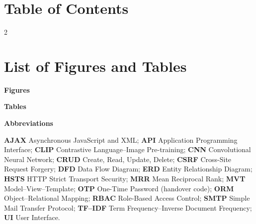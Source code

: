 \documentclass[12pt,a4paper,oneside]{report}
\begin{document}
\clearpage
\chapter*{Table of Contents}
\begingroup
\fontsize{9.6}{11}\selectfont
\setlength{\columnsep}{7mm}
\begin{multicols}{2}
\makeatletter{}\makeatother
\end{multicols}
\endgroup

\clearpage
\chapter*{List of Figures and Tables}
\begingroup
\fontsize{7.9}{8.9}\selectfont
\makeatletter
\setlength{\columnsep}{6mm}
\noindent\begin{minipage}[t]{0.505\textwidth}
\textbf{\color{teal}Figures}\par\vspace{1pt}
\end{minipage}\hfill
\begin{minipage}[t]{0.465\textwidth}
\textbf{\color{teal}Tables}\par\vspace{1pt}
\end{minipage}
\makeatother
\endgroup
\vspace{3pt}
{\color{teal}\bfseries Abbreviations}\par
{\footnotesize\raggedright
\textbf{AJAX} Asynchronous JavaScript and XML; \textbf{API} Application Programming Interface; \textbf{CLIP} Contrastive Language--Image Pre-training; \textbf{CNN} Convolutional Neural Network; \textbf{CRUD} Create, Read, Update, Delete; \textbf{CSRF} Cross-Site Request Forgery; \textbf{DFD} Data Flow Diagram; \textbf{ERD} Entity Relationship Diagram; \textbf{HSTS} HTTP Strict Transport Security; \textbf{MRR} Mean Reciprocal Rank; \textbf{MVT} Model--View--Template; \textbf{OTP} One-Time Password (handover code); \textbf{ORM} Object--Relational Mapping; \textbf{RBAC} Role-Based Access Control; \textbf{SMTP} Simple Mail Transfer Protocol; \textbf{TF--IDF} Term Frequency--Inverse Document Frequency; \textbf{UI} User Interface.\par}
\end{document}
